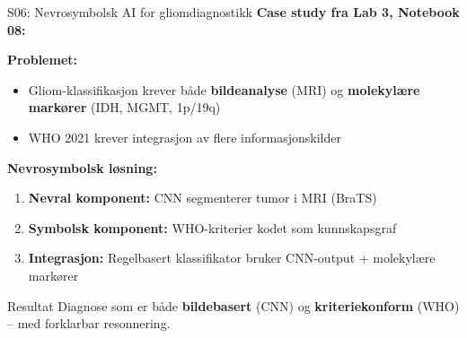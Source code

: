 \documentclass[aspectratio=169, 10pt]{beamer}
\begin{document}
\begin{frame}{S06: Nevrosymbolsk AI for gliomdiagnostikk}
    \textbf{Case study fra Lab 3, Notebook 08:}
    
    \vspace{0.3cm}
    \textbf{Problemet:}
    \begin{itemize}
        \item Gliom-klassifikasjon krever både \textbf{bildeanalyse} (MRI) og \textbf{molekylære markører} (IDH, MGMT, 1p/19q)
        \item WHO 2021 krever integrasjon av flere informasjonskilder
    \end{itemize}
    
    \vspace{0.3cm}
    \textbf{Nevrosymbolsk løsning:}
    \begin{enumerate}
        \item \textbf{Nevral komponent:} CNN segmenterer tumor i MRI (BraTS)
        \item \textbf{Symbolsk komponent:} WHO-kriterier kodet som kunnskapsgraf
        \item \textbf{Integrasjon:} Regelbasert klassifikator bruker CNN-output + molekylære markører
    \end{enumerate}
    
    \vspace{0.3cm}
    \begin{block}{Resultat}
        Diagnose som er både \textbf{bildebasert} (CNN) og \textbf{kriteriekonform} (WHO) -- med forklarbar resonnering.
    \end{block}
\end{frame}
\end{document}
